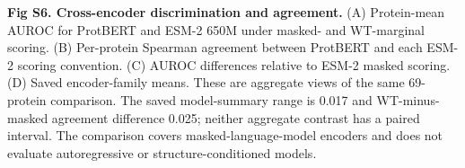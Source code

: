 \caption{{\bf Fig S6. Cross-encoder discrimination and agreement.} (A) Protein-mean AUROC for ProtBERT and ESM-2 650M under masked- and WT-marginal scoring. (B) Per-protein Spearman agreement between ProtBERT and each ESM-2 scoring convention. (C) AUROC differences relative to ESM-2 masked scoring. (D) Saved encoder-family means. These are aggregate views of the same 69-protein comparison. The saved model-summary range is 0.017 and WT-minus-masked agreement difference 0.025; neither aggregate contrast has a paired interval. The comparison covers masked-language-model encoders and does not evaluate autoregressive or structure-conditioned models.}
